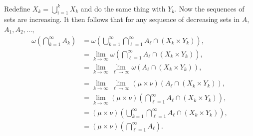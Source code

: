 \documentclass{article}
\theoremstyle{remark}
\begin{document}
\begin{enumerate}[leftmargin=*]
\begin{gather*}
   \end{gather*}
   Redefine $X_k=\bigcup_{i=1}^k X_k$ and do the same thing with $Y_k$. Now the sequences of sets are increasing. It then follows that for any sequence of decreasing sets in $A$, $A_1, A_2,\ldots$, 
   \begin{align*}
       \omega\left(\bigcap_{k=1}^\infty A_k \right) &= \omega\left(\bigcup_{k=1}^\infty\bigcap_{\ell=1}^\infty A_\ell \cap (X_k \times Y_k)\right), \\
       &= \lim_{k\to\infty} \omega\left(\bigcap_{\ell=1}^\infty A_\ell \cap (X_k\times Y_k)\right), \\
       &= \lim_{k\to\infty}\lim_{\ell\to\infty} \omega(A_\ell \cap (X_k\times Y_k)), \\ \tag{since $A_\ell \cap (X_k\times Y_k)$ has finite measure} \\
       &= \lim_{k\to\infty}\lim_{\ell\to\infty} (\mu\times\nu)(A_\ell \cap (X_k\times Y_k)), \\
       &= \lim_{k\to\infty}(\mu\times\nu)\left(\bigcap_{\ell=1}^\infty A_\ell \cap (X_k\times Y_k)\right), \\
       &= (\mu\times\nu)\left(\bigcup_{k=1}^\infty \bigcap_{\ell=1}^\infty A_\ell \cap (X_k \times Y_k)\right), \\
       &= (\mu\times\nu)\left(\bigcap_{\ell=1}^\infty A_\ell\right).
   \end{align*}
\end{enumerate}
\end{document}
